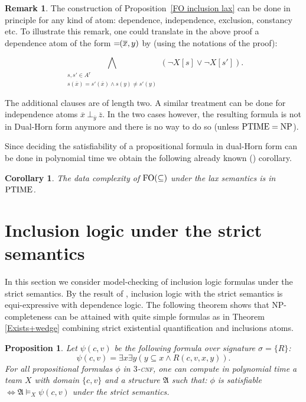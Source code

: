 \documentclass{article}
\theoremstyle{plain}
\newtheorem{corollary}[theorem]{Corollary}
\newtheorem{proposition}[theorem]{Proposition}
\theoremstyle{definition}
\newtheorem{remark}{Remark}
\newcommand{\mA}{{\mathfrak A}}
\newcommand*\dep{{=\mkern-1.2mu}}
\newcommand{\FOinclusion}{{\rm FO(\subseteq)}}
\newcommand{\np}{{\rm NP}}
\newcommand{\Ptime}{{\rm PTIME}}
\newcommand{\tu}[1]{\overline{#1}}
\newcommand{\indep}[3]{{#1}\ \bot_{#2}\ {#3}}
\newcommand{\pb}[1]{\textsc{#1}}
\begin{document}
 \begin{remark} 
The construction of Proposition~\ref{FO inclusion lax} can  be done in principle for any kind of atom: dependence, independence, exclusion, constancy etc. 
To illustrate this remark, one could translate in the above proof a dependence atom of the form $\dep(\tu x,y)$ by (using the notations of the proof):
 
\[\bigwedge_{ \substack{s,s'\in A^r\\ s(\tu x)=s'(\tu x) \wedge s(y)\neq s'(y)}} (\neg X[s]\vee \neg X[s']).\]
 
 The additional clauses are of length two. A similar treatment can be done for independence atoms $\indep{\tu x}{\tu y}{\tu z}$.  In the two cases however, the resulting formula is not in Dual-Horn form anymore and there is no way to do so (unless $\Ptime=\np$).
 \end{remark}
  
  
  Since deciding the satisfiability of a propositional formula in dual-Horn form can be done in polynomial time we obtain the following already known (\cite{gallhella13}) corollary.
  
\begin{corollary}
  The data complexity of $\FOinclusion$ under the lax  semantics  is in $\Ptime$.
  \end{corollary}
  



\section{Inclusion logic under the strict semantics}
In this  section we consider model-checking of inclusion logic formulas  under the strict semantics. By the result of \cite{galhankon13}, inclusion logic with the strict semantics is equi-expressive with dependence logic. The following theorem shows that NP-completeness can be attained with quite simple formulas as in Theorem \ref{Exists+wedge}  combining strict existential quantification and inclusions atoms.
\begin{proposition}\label{StrictInc1}
	Let $\psi(c,v)$ be the following formula over signature $\sigma = \{R\}$:
	$$ \psi(c,v) = \exists x \exists y (y \subseteq x \wedge R(c,v,x,y)).$$
	For all propositional formulas $\phi$ in $3$-\pb{cnf}, one can compute in polynomial time a team $X$ with domain $\{c,v\}$ and a structure $\mA$ such that: $\phi$  is satisfiable  $\Leftrightarrow \mA \models_X \psi(c,v)$ under the strict semantics.
\end{proposition}
\end{document}
